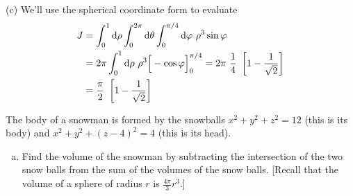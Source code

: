 \begin{solution}
(c) We'll use the spherical coordinate form to evaluate
\begin{align*}
J &=\int_0^{1}\mathrm{d}\rho\int_0^{2\pi}\mathrm{d}\theta
           \int_0^{\pi/4}\mathrm{d}\varphi\ \rho^3\sin\varphi \\
   &=2\pi \int_0^{1}\mathrm{d}\rho\ \rho^3
                     \Big[-\cos\varphi\Big]_0^{\pi/4} 
    =2\pi\ \frac{1}{4}\ \left[1-\frac{1}{\sqrt{2}}\right] \\
    &=\frac{\pi}{2}\ \left[1-\frac{1}{\sqrt{2}}\right]
\end{align*}
\end{solution}

\begin{question}[M200 2011D] %
The body of a snowman is formed by the snowballs $x^2 + y^2 + z^2 = 12$ 
(this is its body) and $x^2 + y^2 + (z - 4)^2 = 4$ (this is its head).
\begin{enumerate}[(a)]
\item
Find the volume of the snowman by subtracting the intersection of the two snow
balls from the sum of the volumes of the snow balls. [Recall that the volume of a
sphere of radius $r$ is $\frac{4\pi}{3} r^3$.]


\end{enumerate}
\end{question}
